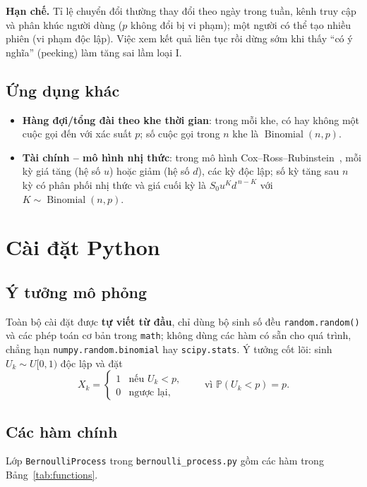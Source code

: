 \documentclass[12pt,a4paper]{article}
\theoremstyle{definition}
\theoremstyle{remark}
\newcommand{\Prob}{\mathbb{P}}
\newcommand{\Bin}{\operatorname{Binomial}}
\begin{document}
\textbf{Hạn chế.} Tỉ lệ chuyển đổi thường thay đổi theo ngày trong tuần, kênh truy cập và phân khúc người dùng
($p$ không đổi bị vi phạm); một người có thể tạo nhiều phiên (vi phạm độc lập). Việc xem kết quả liên tục rồi
dừng sớm khi thấy ``có ý nghĩa'' (peeking) làm tăng sai lầm loại I.

\subsection{Ứng dụng khác}
\begin{itemize}
  \item \textbf{Hàng đợi/tổng đài theo khe thời gian}: trong mỗi khe, có hay không một cuộc gọi đến với xác suất
        $p$; số cuộc gọi trong $n$ khe là $\Bin(n,p)$.
  \item \textbf{Tài chính – mô hình nhị thức}: trong mô hình Cox--Ross--Rubinstein~\cite{crr1979}, mỗi kỳ giá
        tăng (hệ số $u$) hoặc giảm (hệ số $d$), các kỳ độc lập; số kỳ tăng sau $n$ kỳ có phân phối nhị thức và
        giá cuối kỳ là $S_0u^{K}d^{\,n-K}$ với $K\sim\Bin(n,p)$.
\end{itemize}

\section{Cài đặt Python}\label{sec:code}
\subsection{Ý tưởng mô phỏng}
Toàn bộ cài đặt được \textbf{tự viết từ đầu}, chỉ dùng bộ sinh số đều \texttt{random.random()} và các phép toán
cơ bản trong \texttt{math}; không dùng các hàm có sẵn cho quá trình, chẳng hạn
\texttt{numpy.\allowbreak random.\allowbreak binomial} hay \texttt{scipy.\allowbreak stats}. Ý tưởng cốt lõi: sinh $U_k\sim U[0,1)$ độc lập và đặt
\begin{equation}\label{eq:sim}
  X_k = \begin{cases}1 & \text{nếu } U_k < p,\\ 0 & \text{ngược lại,}\end{cases}
  \qquad\text{vì } \Prob(U_k < p) = p .
\end{equation}

\subsection{Các hàm chính}
Lớp \texttt{BernoulliProcess} trong \texttt{bernoulli\_process.py} gồm các hàm trong Bảng~\ref{tab:functions}.
\end{document}
